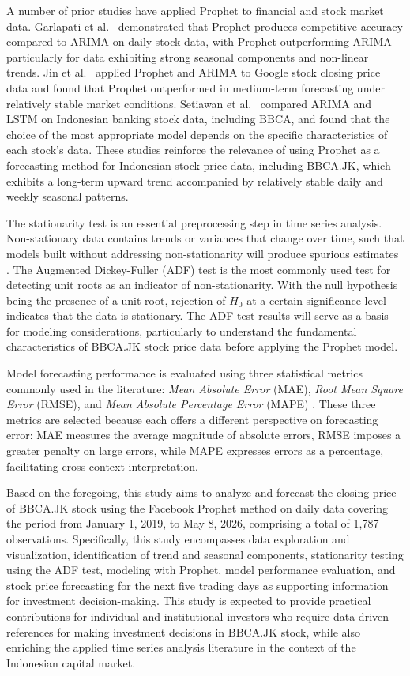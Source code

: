 \documentclass[11pt,twoside]{article}
\begin{document}
A number of prior studies have applied Prophet to financial and stock market data. Garlapati et al.\ \cite{Garlapati2021} demonstrated that Prophet produces competitive accuracy compared to ARIMA on daily stock data, with Prophet outperforming ARIMA particularly for data exhibiting strong seasonal components and non-linear trends. Jin et al.\ \cite{Jin2022} applied Prophet and ARIMA to Google stock closing price data and found that Prophet outperformed in medium-term forecasting under relatively stable market conditions. Setiawan et al.\ \cite{Setiawan2023} compared ARIMA and LSTM on Indonesian banking stock data, including BBCA, and found that the choice of the most appropriate model depends on the specific characteristics of each stock's data. These studies reinforce the relevance of using Prophet as a forecasting method for Indonesian stock price data, including BBCA.JK, which exhibits a long-term upward trend accompanied by relatively stable daily and weekly seasonal patterns.

The stationarity test is an essential preprocessing step in time series analysis. Non-stationary data contains trends or variances that change over time, such that models built without addressing non-stationarity will produce spurious estimates \cite{Granger1974}. The Augmented Dickey-Fuller (ADF) test \cite{Dickey1979} is the most commonly used test for detecting unit roots as an indicator of non-stationarity. With the null hypothesis being the presence of a unit root, rejection of $H_0$ at a certain significance level indicates that the data is stationary. The ADF test results will serve as a basis for modeling considerations, particularly to understand the fundamental characteristics of BBCA.JK stock price data before applying the Prophet model.

Model forecasting performance is evaluated using three statistical metrics commonly used in the literature: \textit{Mean Absolute Error} (MAE), \textit{Root Mean Square Error} (RMSE), and \textit{Mean Absolute Percentage Error} (MAPE) \cite{Hyndman2006}. These three metrics are selected because each offers a different perspective on forecasting error: MAE measures the average magnitude of absolute errors, RMSE imposes a greater penalty on large errors, while MAPE expresses errors as a percentage, facilitating cross-context interpretation.

Based on the foregoing, this study aims to analyze and forecast the closing price of BBCA.JK stock using the Facebook Prophet method on daily data covering the period from January 1, 2019, to May 8, 2026, comprising a total of 1,787 observations. Specifically, this study encompasses data exploration and visualization, identification of trend and seasonal components, stationarity testing using the ADF test, modeling with Prophet, model performance evaluation, and stock price forecasting for the next five trading days as supporting information for investment decision-making. This study is expected to provide practical contributions for individual and institutional investors who require data-driven references for making investment decisions in BBCA.JK stock, while also enriching the applied time series analysis literature in the context of the Indonesian capital market.
\end{document}
